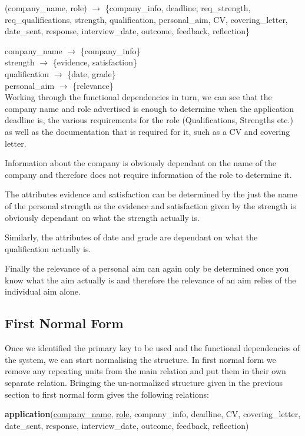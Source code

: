 \documentclass{article}
\begin{document}
(company\_name, role) $\rightarrow$ \{company\_info, deadline, req\_strength, req\_qualifications, strength, qualification, personal\_aim, CV, covering\_letter, date\_sent, response, interview\_date, outcome, feedback, reflection\}

company\_name $\rightarrow$ \{company\_info\}\\
strength $\rightarrow$ \{evidence, satisfaction\}\\
qualification $\rightarrow$ \{date, grade\}\\
personal\_aim $\rightarrow$ \{relevance\}\\

Working through the functional dependencies in turn, we can see that the company name and role advertised is enough to determine when the application deadline is, the various requirements for the role (Qualifications, Strengths etc.) as well as the documentation that is required for it, such as a CV and covering letter. 

Information about the company is obviously dependant on the name of the company and therefore does not require information of the role to determine it.

The attributes evidence and satisfaction can be determined by the just the name of the personal strength as the evidence and satisfaction given by the strength is obviously dependant on what the strength actually is.

Similarly, the attributes of date and grade are dependant on what the qualification actually is.

Finally the relevance of a personal aim can again only be determined once you know what the aim actually is and therefore the relevance of an aim relies of the individual aim alone.

\subsection{First Normal Form}

Once we identified the primary key to be used and the functional dependencies of the system, we can start normalising the structure. In first normal form we remove any repeating units from the main relation and put them in their own separate relation. Bringing the un-normalized structure given in the previous section to first normal form gives the following relations:

\textbf{application}(\underline{company\_name}, \underline{role}, company\_info, deadline, CV, covering\_letter, date\_sent, response, interview\_date, outcome, feedback, reflection)
\end{document}
